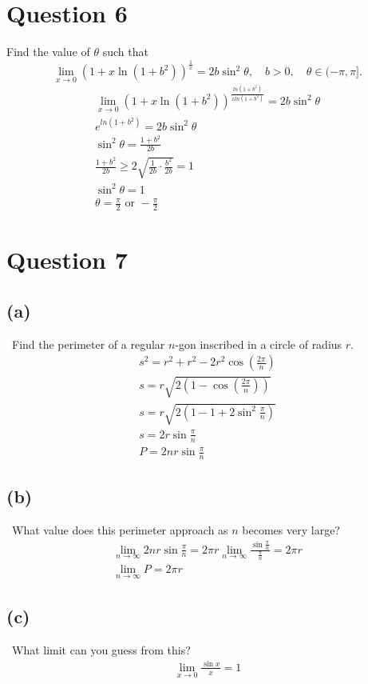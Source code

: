 \documentclass[12pt]{article}
\begin{document}
\section{Question 6}
Find the value of $\theta$ such that
\[
\lim\limits_{x \to 0} (1+x\ln (1+b^2))^{\frac{1}{x}}=2b\sin ^2 \theta, \quad b>0, \quad \theta \in (-\pi,\pi].
\]
\begin{gather*}
    \lim\limits_{x \to 0} (1+x\ln (1+b^2))^{\frac{ln(1+b^2)}{xln(1+b^2)}}=2b\sin ^2 \theta\\
    e ^{ln(1+b^2)}=2b\sin ^2 \theta\\
    \sin ^2 \theta = \frac{1+b^2}{2b}\\
    \frac{1+b^2}{2b}\ge 2\sqrt{\frac{1}{2b}\cdot \frac{b^2}{2b}}=1\\
    \sin ^2 \theta = 1\\
    \boxed{\theta = \frac{\pi}{2} \text{ or } -\frac{\pi}{2}}
\end{gather*}

\section{Question 7}
\subsection{(a)} \, Find the perimeter of a regular $n$-gon inscribed in a circle of radius $r$.
\begin{gather*}
    s^2=r^2+r^2-2r^2\cos (\frac{2\pi}{n})\\
    s=r\sqrt{2(1-\cos (\frac{2\pi}{n}))}\\
    s=r\sqrt{2(1-1+2 \sin^2 \frac{\pi}{n})}\\
    s=2r \sin \frac{\pi}{n}\\
    \boxed{P=2nr \sin \frac{\pi}{n}}
\end{gather*}

\subsection{(b)} \, What value does this perimeter approach as $n$ becomes very large?
\begin{gather*}
    \lim_{n \to \infty}2nr \sin \frac{\pi}{n}=2\pi r\lim_{n \to \infty} \frac{\sin \frac{\pi}{n}}{\frac{\pi}{n}}=2\pi r\\
    \boxed{\lim_{n \to \infty}P=2\pi r}
\end{gather*}

\subsection{(c)} \, What limit can you guess from this?
\begin{gather*}
    \boxed{\lim_{x \to 0}\frac{\sin x}{x}=1}
\end{gather*}
\end{document}
